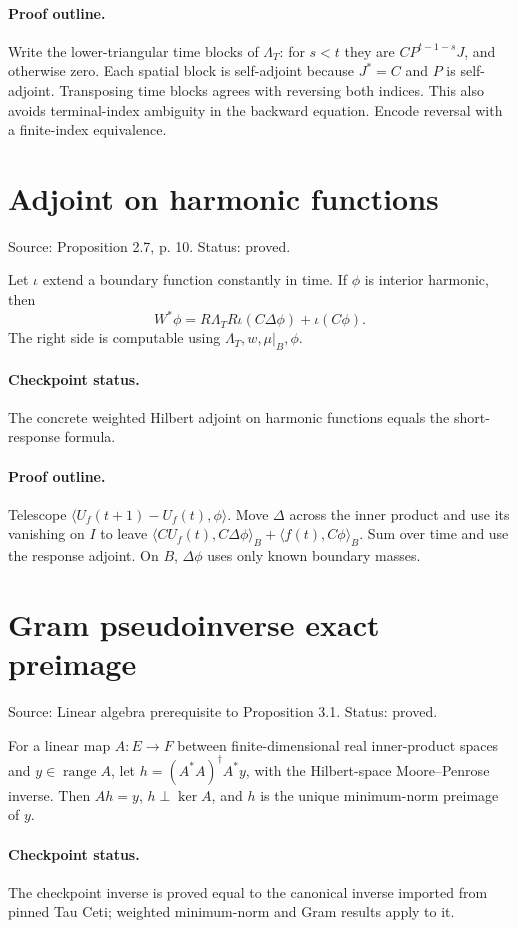 \paragraph{Proof outline.}

Write the lower-triangular time blocks of $\Lambda_T$: for $s<t$ they are $CP^{t-1-s}J$, and otherwise zero. Each spatial block is self-adjoint because $J^*=C$ and $P$ is self-adjoint. Transposing time blocks agrees with reversing both indices. This also avoids terminal-index ambiguity in the backward equation. Encode reversal with a finite-index equivalence.
\nodebreak
\section{Adjoint on harmonic functions}
Source: Proposition 2.7, p. 10. Status: proved.
\begin{proposition}\label{harmonic-adjoint}

Let $\iota$ extend a boundary function constantly in time. If $\phi$ is interior harmonic, then \[W^*\phi=R\Lambda_TR\iota(C\Delta\phi)+\iota(C\phi).\] The right side is computable using $\Lambda_T,w,\mu|_B,\phi$.


\paragraph{Checkpoint status.}
The concrete weighted Hilbert adjoint on harmonic functions equals the short-response formula.
\end{proposition}
\paragraph{Proof outline.}

Telescope $\langle U_f(t+1)-U_f(t),\phi\rangle$. Move $\Delta$ across the inner product and use its vanishing on $I$ to leave $\langle CU_f(t),C\Delta\phi\rangle_B+\langle f(t),C\phi\rangle_B$. Sum over time and use the response adjoint. On $B$, $\Delta\phi$ uses only known boundary masses.
\nodebreak
\section{Gram pseudoinverse exact preimage}
Source: Linear algebra prerequisite to Proposition 3.1. Status: proved.
\begin{lemma}\label{pseudoinverse}

For a linear map $A:E\to F$ between finite-dimensional real inner-product spaces and $y\in\operatorname{range}A$, let $h=(A^*A)^\dagger A^*y$, with the Hilbert-space Moore--Penrose inverse. Then $Ah=y$, $h\perp\ker A$, and $h$ is the unique minimum-norm preimage of $y$.


\paragraph{Checkpoint status.}
The checkpoint inverse is proved equal to the canonical inverse imported from pinned Tau Ceti; weighted minimum-norm and Gram results apply to it.
\end{lemma}
